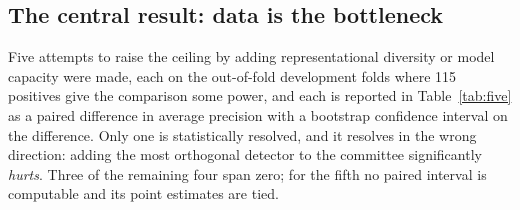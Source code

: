\documentclass[11pt]{article}
\begin{document}
\subsection{The central result: data is the bottleneck}
\label{sec:central}

Five attempts to raise the ceiling by adding representational diversity or model capacity were made, each on the out-of-fold development folds where 115 positives give the comparison some power, and each is reported in Table~\ref{tab:five} as a paired difference in average precision with a bootstrap confidence interval on the difference. Only one is statistically resolved, and it resolves in the wrong direction: adding the most orthogonal detector to the committee significantly \emph{hurts}. Three of the remaining four span zero; for the fifth no paired interval is computable and its point estimates are tied.
\end{document}
